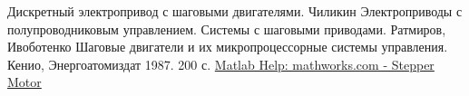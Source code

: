 \newpage
\begin{thebibliography}{20}
     Дискретный электропривод с шаговыми двигателями. Чиликин
     Электроприводы с полупроводниковым управлением. Системы с шаговыми приводами. Ратмиров, Ивоботенко
     Шаговые двигатели и их микропроцессорные системы управления. Кенио, Энергоатомиздат 1987. 200 с.
     \href{http://www.mathworks.com/help/physmod/sps/powersys/ref/steppermotor.html}{Matlab Help: mathworks.com - Stepper Motor}
\end{thebibliography}

\endinput


